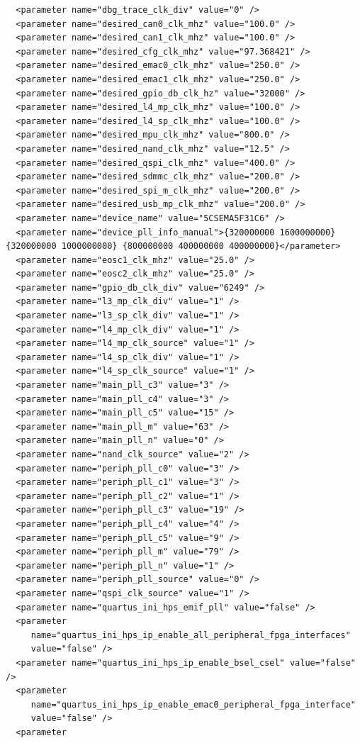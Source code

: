\documentclass[conference]{IEEEtran}
\begin{document}
\begin{lstlisting}
  <parameter name="dbg_trace_clk_div" value="0" />
  <parameter name="desired_can0_clk_mhz" value="100.0" />
  <parameter name="desired_can1_clk_mhz" value="100.0" />
  <parameter name="desired_cfg_clk_mhz" value="97.368421" />
  <parameter name="desired_emac0_clk_mhz" value="250.0" />
  <parameter name="desired_emac1_clk_mhz" value="250.0" />
  <parameter name="desired_gpio_db_clk_hz" value="32000" />
  <parameter name="desired_l4_mp_clk_mhz" value="100.0" />
  <parameter name="desired_l4_sp_clk_mhz" value="100.0" />
  <parameter name="desired_mpu_clk_mhz" value="800.0" />
  <parameter name="desired_nand_clk_mhz" value="12.5" />
  <parameter name="desired_qspi_clk_mhz" value="400.0" />
  <parameter name="desired_sdmmc_clk_mhz" value="200.0" />
  <parameter name="desired_spi_m_clk_mhz" value="200.0" />
  <parameter name="desired_usb_mp_clk_mhz" value="200.0" />
  <parameter name="device_name" value="5CSEMA5F31C6" />
  <parameter name="device_pll_info_manual">{320000000 1600000000} {320000000 1000000000} {800000000 400000000 400000000}</parameter>
  <parameter name="eosc1_clk_mhz" value="25.0" />
  <parameter name="eosc2_clk_mhz" value="25.0" />
  <parameter name="gpio_db_clk_div" value="6249" />
  <parameter name="l3_mp_clk_div" value="1" />
  <parameter name="l3_sp_clk_div" value="1" />
  <parameter name="l4_mp_clk_div" value="1" />
  <parameter name="l4_mp_clk_source" value="1" />
  <parameter name="l4_sp_clk_div" value="1" />
  <parameter name="l4_sp_clk_source" value="1" />
  <parameter name="main_pll_c3" value="3" />
  <parameter name="main_pll_c4" value="3" />
  <parameter name="main_pll_c5" value="15" />
  <parameter name="main_pll_m" value="63" />
  <parameter name="main_pll_n" value="0" />
  <parameter name="nand_clk_source" value="2" />
  <parameter name="periph_pll_c0" value="3" />
  <parameter name="periph_pll_c1" value="3" />
  <parameter name="periph_pll_c2" value="1" />
  <parameter name="periph_pll_c3" value="19" />
  <parameter name="periph_pll_c4" value="4" />
  <parameter name="periph_pll_c5" value="9" />
  <parameter name="periph_pll_m" value="79" />
  <parameter name="periph_pll_n" value="1" />
  <parameter name="periph_pll_source" value="0" />
  <parameter name="qspi_clk_source" value="1" />
  <parameter name="quartus_ini_hps_emif_pll" value="false" />
  <parameter
     name="quartus_ini_hps_ip_enable_all_peripheral_fpga_interfaces"
     value="false" />
  <parameter name="quartus_ini_hps_ip_enable_bsel_csel" value="false" />
  <parameter
     name="quartus_ini_hps_ip_enable_emac0_peripheral_fpga_interface"
     value="false" />
  <parameter

\end{lstlisting}
\end{document}
